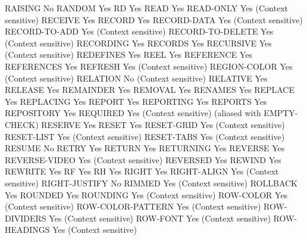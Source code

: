 RAISING                         No
RANDOM                          Yes
RD                              Yes
READ                            Yes
READ-ONLY                       Yes (Context sensitive)
RECEIVE                         Yes
RECORD                          Yes
RECORD-DATA                     Yes (Context sensitive)
RECORD-TO-ADD                   Yes (Context sensitive)
RECORD-TO-DELETE                Yes (Context sensitive)
RECORDING                       Yes
RECORDS                         Yes
RECURSIVE                       Yes (Context sensitive)
REDEFINES                       Yes
REEL                            Yes
REFERENCE                       Yes
REFERENCES                      Yes
REFRESH                         Yes (Context sensitive)
REGION-COLOR                    Yes (Context sensitive)
RELATION                        No (Context sensitive)
RELATIVE                        Yes
RELEASE                         Yes
REMAINDER                       Yes
REMOVAL                         Yes
RENAMES                         Yes
REPLACE                         Yes
REPLACING                       Yes
REPORT                          Yes
REPORTING                       Yes
REPORTS                         Yes
REPOSITORY                      Yes
REQUIRED                        Yes (Context sensitive) (aliased with EMPTY-CHECK)
RESERVE                         Yes
RESET                           Yes
RESET-GRID                      Yes (Context sensitive)
RESET-LIST                      Yes (Context sensitive)
RESET-TABS                      Yes (Context sensitive)
RESUME                          No
RETRY                           Yes
RETURN                          Yes
RETURNING                       Yes
REVERSE                         Yes
REVERSE-VIDEO                   Yes (Context sensitive)
REVERSED                        Yes
REWIND                          Yes
REWRITE                         Yes
RF                              Yes
RH                              Yes
RIGHT                           Yes
RIGHT-ALIGN                     Yes (Context sensitive)
RIGHT-JUSTIFY                   No
RIMMED                          Yes (Context sensitive)
ROLLBACK                        Yes
ROUNDED                         Yes
ROUNDING                        Yes (Context sensitive)
ROW-COLOR                       Yes (Context sensitive)
ROW-COLOR-PATTERN               Yes (Context sensitive)
ROW-DIVIDERS                    Yes (Context sensitive)
ROW-FONT                        Yes (Context sensitive)
ROW-HEADINGS                    Yes (Context sensitive)
